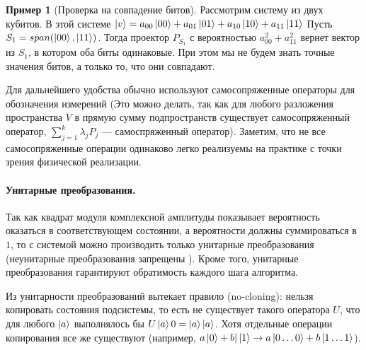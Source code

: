 \documentclass{article}
\theoremstyle{definition}
\newtheorem{example}{Пример}
\begin{document}
\begin{example}[Проверка на совпадение битов]
    Рассмотрим систему из двух кубитов.
    В этой системе $\ket{v} = a_{00}\ket{00} + a_{01}\ket{01} + a_{10}\ket{10} + a_{11}\ket{11}$
    Пусть $S_1 = span(\ket{00}, \ket{11})$.
    Тогда проектор $P_{S_1}$ с вероятностью $a_{00}^2 + a_{11}^2$ вернет вектор из $S_1$,
    в котором оба биты одинаковые.
    При этом мы не будем знать точные значения битов, а только то, что они совпадают.
\end{example}

Для дальнейшего удобства обычно используют самосопряженные операторы для обозначения измерений
(Это можно делать, так как для любого разложения пространства $V$ в прямую сумму подпространств существует
самосопряженный оператор, $\sum_{j=1}^k \lambda_j P_j$ --- самоспряженный оператор).
Заметим, что не все самосопряженные операции одинаково легко реализуемы на практике с точки зрения физической реализации.


\paragraph*{Унитарные преобразования.}
Так как квадрат модуля комплексной амплитуды показывает вероятность оказаться в соответствующем состоянии,
а вероятности должны суммироваться в $1$,
то с системой можно производить только унитарные преобразования
(неунитарные преобразования запрещены ).
Кроме того, унитарные преобразования гарантируют обратимость каждого шага алгоритма.

Из унитарности преобразований вытекает правило (no-cloning): нельзя копировать состояния подсистемы,
то есть не существует такого оператора $U$, что для любого $\ket{a}$ выполнялось бы $U\ket{a}{0} = \ket{a}\ket{a}$.
Хотя отдельные операции копирования все же существуют
(например, $a\ket{0} + b|\ket{1} \rightarrow a\ket{0\ldots0} + b\ket{1\ldots1}$).
\end{document}
